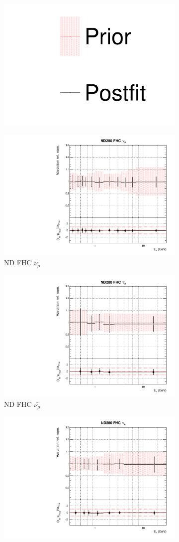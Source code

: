 \begin{figure}[!htbp]
\centering
\begin{subfigure}{0.8\textwidth}
  \centering
  \includegraphics[width=0.24\linewidth]{figs/asmv_leg}
\end{subfigure}
\begin{subfigure}{0.45\textwidth}
  \centering
  \includegraphics[width=0.75\linewidth]{figs/asmvfluxpoly0}
  \caption{ND FHC $\nu_{\mu}$}
\end{subfigure}
\begin{subfigure}{0.45\textwidth}
  \centering
  \includegraphics[width=0.75\linewidth]{figs/asmvfluxpoly1}
  \caption{ND FHC $\bar{\nu_{\mu}}$}
\end{subfigure}
\begin{subfigure}{0.45\textwidth}
  \centering
  \includegraphics[width=0.75\linewidth]{figs/asmvfluxpoly2}

\end{subfigure}
\end{figure}
